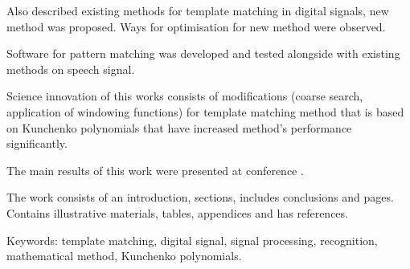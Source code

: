 Also described existing methods for template matching in digital signals, new method was proposed.
Ways for optimisation for new method were observed.

Software for pattern matching was developed and tested alongside with existing methods on speech signal.

Science innovation of this works consists of modifications (coarse search, application of windowing functions) for
template matching method that is based on Kunchenko polynomials that have increased method's performance
significantly.

The main results of this work were presented at conference .

The work consists of an introduction,  sections, includes conclusions and  pages.
Contains  illustrative materials,  tables,  appendices and has
 references.

Keywords: template matching, digital signal, signal processing, recognition, mathematical method, Kunchenko
polynomials.

